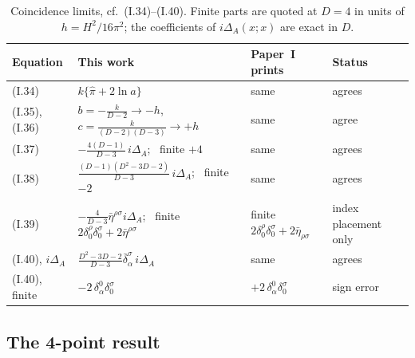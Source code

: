 \documentclass[aps,prd,onecolumn,10pt,nofootinbib,floatfix]{revtex4-2}
\newcommand{\PI}{Paper~I}
\newcommand{\eqI}[1]{(I.#1)}
\newcommand{\pihat}{\hat\pi}
\begin{document}
\begin{table}[t]
\caption{Coincidence limits, cf.\ \eqI{34}--\eqI{40}. Finite parts are quoted at $D=4$ in
units of $h=H^2/16\pi^2$; the coefficients of $i\Delta_A(x;x)$ are exact in $D$.}
\label{tab:s3:coinc}
\begin{ruledtabular}
\begin{tabular}{llll}
Equation & This work & \PI{} prints & Status\\
\hline
\eqI{34} & $k\{\pihat+2\ln a\}$ & same & agrees\\
\eqI{35}, \eqI{36} & $b=-\frac{k}{D-2}\to-h$, \ $c=\frac{k}{(D-2)(D-3)}\to+h$ & same & agree\\
\eqI{37} & $-\frac{4(D-1)}{D-3}\,i\Delta_A$; \ finite $+4$ & same & agrees\\
\eqI{38} & $\frac{(D-1)(D^2-3D-2)}{D-3}\,i\Delta_A$; \ finite $-2$ & same & agrees\\
\eqI{39} & $-\frac4{D-3}\bar\eta^{\rho\sigma}i\Delta_A$; \ finite $2\delta^\rho_0\delta^\sigma_0+2\bar\eta^{\rho\sigma}$
 & finite $2\delta^\rho_0\delta^\sigma_0+2\bar\eta_{\rho\sigma}$ & index placement only\\
\eqI{40}, $i\Delta_A$ & $\frac{D^2-3D-2}{D-3}\bar\delta^\sigma_\alpha\,i\Delta_A$ & same & agrees\\
\eqI{40}, finite & $-2\,\delta^0_\alpha\delta^\sigma_0$ & $+2\,\delta^0_\alpha\delta^\sigma_0$ & sign error\\
\end{tabular}
\end{ruledtabular}
\end{table}

\subsection{The 4-point result}
\label{sec:s3:result}
\end{document}
